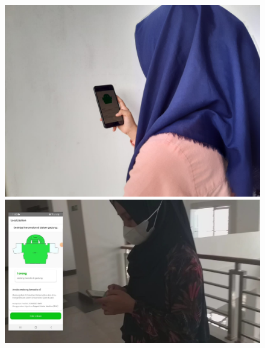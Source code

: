 \begin{figure}[htp]
  \medskip

  \includegraphics[width=.4\textwidth]{gambar/lampiran/umux2.jpeg}\quad
  \includegraphics[width=.4\textwidth]{gambar/lampiran/umux6.jpeg}\quad
  \label{sus-mahasiswa}
\end{figure}

